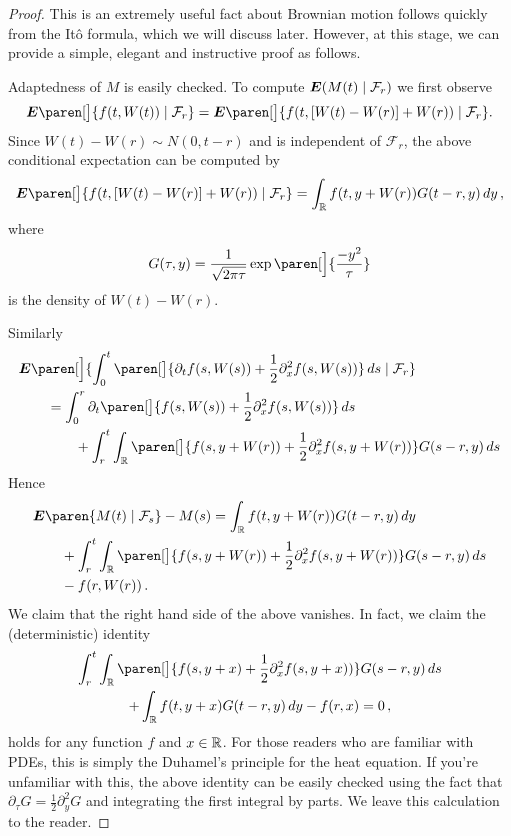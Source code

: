\begin{proof}
  This is an extremely useful fact about Brownian motion follows quickly from the It\^o formula, which we will discuss later.
  However, at this stage, we can provide a simple, elegant and instructive proof as follows.

  Adaptedness of $M$ is easily checked.
  To compute $\E( M(t) \given \mathcal F_r )$ we first observe
  \begin{equation*}
    \E \paren[\big]{ f( t, W(t) ) \given \mathcal F_r }
    = \E \paren[\big]{ f( t, \brak{W(t) - W(r)} + W(r) ) \given \mathcal F_r }.
  \end{equation*}
  Since $W(t) - W(r) \sim N(0, t - r)$ and is independent of $\mathcal F_r$, the above conditional expectation can be computed by
  \begin{equation*}
    \E \paren[\big]{ f( t, \brak{W(t) - W(r)} + W(r) ) \given \mathcal F_r }
    = \int_\R f(t, y + W(r)) G(t -r, y) \, dy \,,
  \end{equation*}
  where
  \begin{equation*}
    G(\tau , y ) = \frac{1}{\sqrt{2 \pi \tau}} \exp\paren[\Big]{ \frac{-y^2}{\tau} }
  \end{equation*}
  is the density of $W(t) - W(r)$.

  Similarly
  \begin{align*}
    \MoveEqLeft
    \E\paren[\Big]{
      \int_0^t \paren[\big]{
	\partial_t f(s, W(s)) + \frac{1}{2} \partial_x^2 f(s, W(s))
      } \, ds \given \mathcal F_r}
    \\
    &= \int_0^r \partial_t \paren[\big]{ f(s, W(s)) + \frac{1}{2} \partial_x^2 f(s, W(s)) } \, ds
    \\
    &\qquad
      + \int_r^t \int_\R \paren[\big]{
	    f(s, y + W(r)) + \frac{1}{2} \partial_x^2 f(s, y + W(r))
	} G(s - r, y) \, ds
  \end{align*}
  Hence
  \begin{align*}
    \MoveEqLeft
    \E\paren{ M(t) \given \mathcal F_s } - M(s)
    = \int_\R f(t, y + W(r)) G(t -r, y) \, dy 
    \\
      &+ \int_r^t \int_\R \paren[\big]{
	    f(s, y + W(r)) + \frac{1}{2} \partial_x^2 f(s, y + W(r))
	} G(s - r, y) \, ds
    \\
      &- f(r, W(r))\,.
  \end{align*}
  We claim that the right hand side of the above vanishes.
  In fact, we claim the (deterministic) identity 
  \begin{multline*}
    \int_r^t \int_\R \paren[\big]{
	  f(s, y + x) + \frac{1}{2} \partial_x^2 f(s, y + x))
      } G(s - r, y) \, ds
    \\
    + \int_\R f(t, y + x) G(t -r, y) \, dy 
      - f(r, x) = 0 \,,
  \end{multline*}
  holds for any function $f$ and $x \in \mathbb{R}$.
  For those readers who are familiar with PDEs, this is simply the Duhamel's principle for the heat equation.
  If you're unfamiliar with this, the above identity can be easily checked using the fact that $\partial_\tau G = \frac{1}{2} \partial_y^2 G$ and integrating the first integral by parts.
  We leave this calculation to the reader.
\end{proof}
